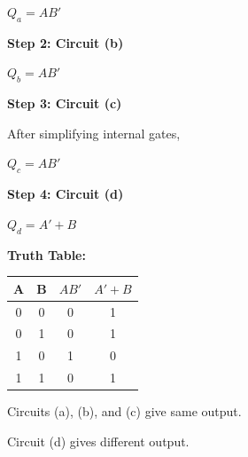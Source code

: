 \documentclass[12pt]{article}
\begin{document}
$Q_a = A B'$

\vspace{0.4cm}

\textbf{Step 2: Circuit (b)}

$Q_b = A B'$

\vspace{0.4cm}

\textbf{Step 3: Circuit (c)}

After simplifying internal gates,

$Q_c = A B'$

\vspace{0.4cm}

\textbf{Step 4: Circuit (d)}

$Q_d = A' + B$

\vspace{0.6cm}

\textbf{Truth Table:}

\begin{center}
\begin{tabular}{|c|c|c|c|}
\hline
A & B & $A B'$ & $A' + B$ \\
\hline
0 & 0 & 0 & 1 \\
0 & 1 & 0 & 1 \\
1 & 0 & 1 & 0 \\
1 & 1 & 0 & 1 \\
\hline
\end{tabular}
\end{center}

\vspace{0.6cm}

Circuits (a), (b), and (c) give same output.

Circuit (d) gives different output.

\vspace{0.8cm}

\begin{center}
\huge {}
\end{center}
\end{document}
